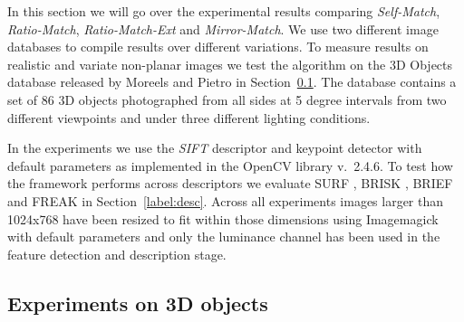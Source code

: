 \documentclass[journal]{IEEEtran}
\begin{document}
In this section we will go over the experimental results comparing 
\emph{Self-Match}, \emph{Ratio-Match}, \emph{Ratio-Match-Ext} and 
\emph{Mirror-Match}. We use two different image databases to compile 
results over different variations.  To measure results on realistic and 
variate non-planar images we test the algorithm on the 3D Objects 
database released by Moreels and Pietro \cite{moreels2007evaluation} in 
Section~\ref{S:3dobjects}. The database contains a set of 86 3D objects 
photographed from all sides at 5 degree intervals from two different 
viewpoints and under three different lighting conditions.

In the experiments we use the \emph{SIFT} descriptor and keypoint 
detector with default parameters as implemented in the OpenCV library 
v.\ 2.4.6.  To test how the framework performs across descriptors we 
evaluate SURF \cite{bay2006surf}, BRISK \cite{leutenegger2011brisk}, 
BRIEF \cite{calonder2010brief} and FREAK \cite{alahi2012freak} in 
Section~\ref{label:desc}. Across all experiments images larger than 
1024x768 have been resized to fit within those dimensions using 
Imagemagick with default parameters and only the luminance channel has 
been used in the feature detection and description stage.

\subsection{Experiments on 3D objects}
\label{S:3dobjects}
\end{document}
